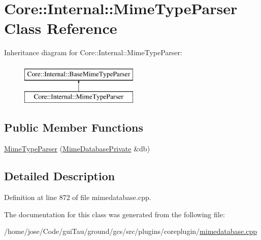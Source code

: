 \hypertarget{class_core_1_1_internal_1_1_mime_type_parser}{\section{Core\-:\-:Internal\-:\-:Mime\-Type\-Parser Class Reference}
\label{class_core_1_1_internal_1_1_mime_type_parser}
}
Inheritance diagram for Core\-:\-:Internal\-:\-:Mime\-Type\-Parser\-:\begin{figure}[H]
\begin{center}
\leavevmode
\includegraphics[height=2.000000cm]{class_core_1_1_internal_1_1_mime_type_parser}
\end{center}
\end{figure}
\subsection*{Public Member Functions}
\begin{DoxyCompactItemize}
\item 
\hyperlink{group___core_plugin_ga5ba7996bcf637b8a7a1a5bcb4e006cb9}{Mime\-Type\-Parser} (\hyperlink{class_core_1_1_mime_database_private}{Mime\-Database\-Private} \&db)
\end{DoxyCompactItemize}


\subsection{Detailed Description}


Definition at line 872 of file mimedatabase.\-cpp.



The documentation for this class was generated from the following file\-:\begin{DoxyCompactItemize}
\item 
/home/jose/\-Code/gui\-Tau/ground/gcs/src/plugins/coreplugin/\hyperlink{mimedatabase_8cpp}{mimedatabase.\-cpp}\end{DoxyCompactItemize}
